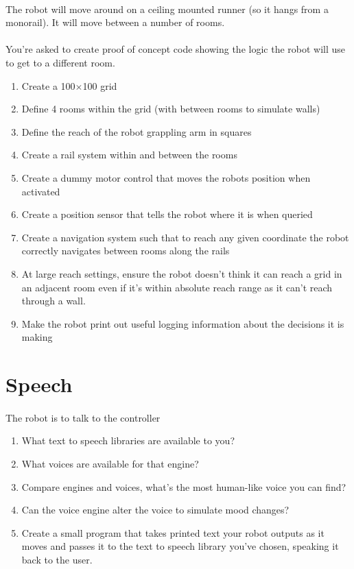 \documentclass[11pt]{book}
\begin{document}
\paragraph{} The robot will move around on a ceiling mounted runner (so it hangs from a monorail). It will move between a number of rooms.

\paragraph{} You're asked to create proof of concept code showing the logic the robot will use to get to a different room.

\begin{enumerate}
\item Create a 100$\times$100 grid
\item Define 4 rooms within the grid (with between rooms to simulate walls)
\item Define the reach of the robot grappling arm in squares
\item Create a rail system within and between the rooms
\item Create a dummy motor control that moves the robots position when activated
\item Create a position sensor that tells the robot where it is when queried
\item Create a navigation system such that to reach any given coordinate the robot correctly navigates between rooms along the rails
\item At large reach settings, ensure the robot doesn't think it can reach a grid in an adjacent room even if it's within absolute reach range as it can't reach through a wall.
\item Make the robot print out useful logging information about the decisions it is making
\end{enumerate}

\clearpage

\section{Speech}

\paragraph{} The robot is to talk to the controller

\begin{enumerate}
\item What text to speech libraries are available to you?
\item What voices are available for that engine?
\item Compare engines and voices, what's the most human-like voice you can find?
\item Can the voice engine alter the voice to simulate mood changes?
\item Create a small program that takes printed text your robot outputs as it moves and passes it to the text to speech library you've chosen, speaking it back to the user.
\end{enumerate}
\end{document}
